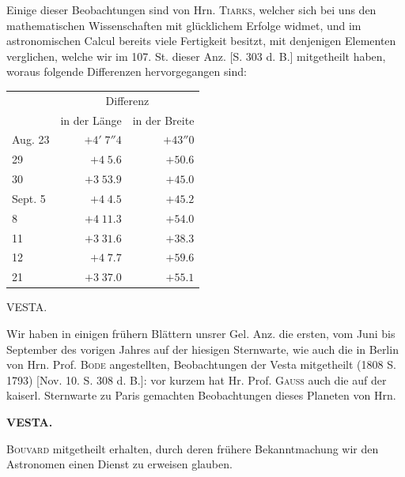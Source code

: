 \par\indent Einige dieser Beobachtungen sind von Hrn. \textsc{Tiarks}, welcher sich bei uns den mathematischen Wissenschaften mit glücklichem Erfolge widmet, und im astronomischen Calcul bereits viele Fertigkeit besitzt, mit denjenigen Elementen verglichen, welche wir im 107. St. dieser Anz. [S. 303 d. B.] mitgetheilt haben, woraus folgende Differenzen hervorgegangen sind:


\begin{center}\fontsize{10}{12}\selectfont\setlength{\tabcolsep}{5pt}\renewcommand{\arraystretch}{1.15}\begin{tabular}{lrr}
 & \multicolumn{2}{c}{Differenz}\\
 & in der Länge & in der Breite\\\hline
Aug. 23 & $+4'\;7''4$ & $+43''0$\\
29 & $+4\;5.6$ & $+50.6$\\
30 & $+3\;53.9$ & $+45.0$\\
Sept. 5 & $+4\;4.5$ & $+45.2$\\
8 & $+4\;11.3$ & $+54.0$\\
11 & $+3\;31.6$ & $+38.3$\\
12 & $+4\;7.7$ & $+59.6$\\
21 & $+3\;37.0$ & $+55.1$\\
\end{tabular}\end{center}


\par{}\bigskip
\begin{center}
\large VESTA.
\end{center}

\par\indent Wir haben in einigen frühern Blättern unsrer Gel. Anz. die ersten, vom Juni bis September des vorigen Jahres auf der hiesigen Sternwarte, wie auch die in Berlin von Hrn. Prof. \textsc{Bode} angestellten, Beobachtungen der Vesta mitgetheilt (1808 S. 1793) [Nov. 10. S. 308 d. B.]: vor kurzem hat Hr. Prof. \textsc{Gauss} auch die auf der kaiserl. Sternwarte zu Paris gemachten Beobachtungen dieses Planeten von Hrn.
\par
{}
\clearpage
\thispagestyle{empty}
\noindent{}%
%
\parbox[t]{\dimexpr\linewidth-24mm\relax}{\centering\footnotesize\bfseries VESTA.\par}%
\makebox[12mm][r]{}\par\nobreak\medskip
\noindent\textsc{Bouvard} mitgetheilt erhalten, durch deren frühere Bekanntmachung wir den Astronomen einen Dienst zu erweisen glauben.

